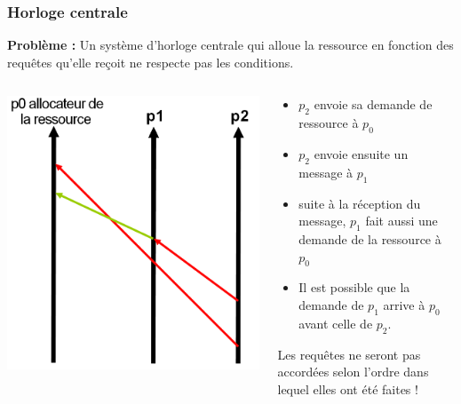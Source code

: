 \documentclass[compress]{beamer}
\begin{document}
\begin{frame}
\frametitle{Horloge centrale}
\textbf{{\color{red}Problème : }} Un système d'horloge centrale qui alloue la ressource en fonction des requêtes qu'elle reçoit ne respecte pas les conditions.\\\bigskip

\begin{columns}
    \begin{column}{.4\textwidth}
		\includegraphics[scale=0.55]{process4.png}
    \end{column}
	\begin{column}{0.6 \textwidth}
	\begin{itemize}
	\item 	$p_2$ envoie sa demande de ressource à $p_0$\\
	\item  	$p_2$ envoie ensuite un message à $p_1$\\
	\item 	suite à la réception du message, $p_1$ fait aussi une demande de la ressource à $p_0$\\
	\item Il est possible que la demande de $p_1$ arrive à $p_0$ avant celle de $p_2$.
	\end{itemize}
 \bigskip Les requêtes ne seront pas accordées selon l'ordre dans lequel elles ont été faites !
	\end{column}
	\end{columns}
\end{frame}
\end{document}
